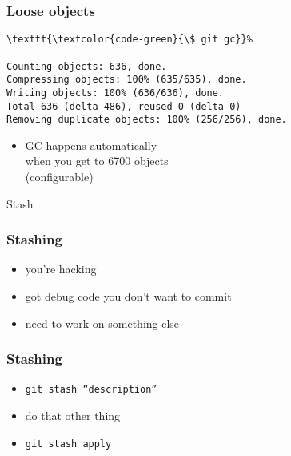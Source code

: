 \documentclass[english]{beamer}
\newcommand{\CMD}[1]{%
\texttt{\textcolor{code-green}{#1}}%
}
\newcommand{\faint}[1]{%
\textcolor{code-gray}{#1}%
}
\begin{document}
\begin{frame}[fragile]
\frametitle{Loose objects}

\begin{Verbatim}[commandchars=\\\{\}]
\CMD{\$ git gc}
Counting objects: 636, done.
Compressing objects: 100% (635/635), done.
Writing objects: 100% (636/636), done.
Total 636 (delta 486), reused 0 (delta 0)
Removing duplicate objects: 100% (256/256), done.
\end{Verbatim}

\pause{}
\vspace{\baselineskip}
\begin{itemize}
        \item GC happens automatically \\
                when you get to 6700 objects \\
                \faint{(configurable)}
\end{itemize}
\end{frame}

\begin{frame}
\begin{center}
        Stash
\end{center}
\end{frame}

\begin{frame}
\frametitle{Stashing}
\begin{itemize}
        \item you're hacking
                \pause{}
                \vspace{\baselineskip}
        \item got debug code you don't want to commit
                \pause{}
                \vspace{\baselineskip}
        \item need to work on something else
\end{itemize}
\end{frame}

\begin{frame}
\frametitle{Stashing}
\begin{itemize}
        \item \CMD{git stash ``description''}
                \pause{}
                \vspace{\baselineskip}
        \item do that other thing
                \pause{}
                \vspace{\baselineskip}
        \item \CMD{git stash apply}
\end{itemize}
\end{frame}
\end{document}
